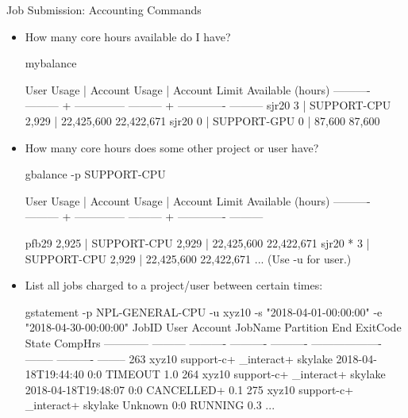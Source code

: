 \begin{frame}[fragile]{Job Submission: Accounting Commands}
\begin{itemize}
\item{How many core hours available do I have?}
\begin{semiverbatim}
\tiny
mybalance

User           Usage |        Account     Usage | Account Limit Available (hours)
---------- --------- + -------------- --------- + ------------- ---------
sjr20              3 |    SUPPORT-CPU     2,929 |    22,425,600 {\color{red}22,422,671}
sjr20              0 |    SUPPORT-GPU         0 |        87,600    {\color{red}87,600}
\end{semiverbatim}
\smallskip
\item{How many core hours does some other project or user have?}
\begin{semiverbatim}
\tiny
gbalance -p SUPPORT-CPU

User           Usage |        Account     Usage | Account Limit Available (hours)
---------- --------- + -------------- --------- + ------------- ---------

pfb29          2,925 |    SUPPORT-CPU     2,929 |    22,425,600 22,422,671
sjr20 *            3 |    SUPPORT-CPU     2,929 |    22,425,600 22,422,671
...
(Use -u for user.)
\end{semiverbatim}
\smallskip
\item{List all jobs charged to a project/user between certain times:}
\begin{semiverbatim}
\Tiny
gstatement -p NPL-GENERAL-CPU  -u xyz10 -s "2018-04-01-00:00:00" -e "2018-04-30-00:00:00" 
       JobID      User    Account    JobName  Partition                 End ExitCode      State  CompHrs 
------------ --------- ---------- ---------- ---------- ------------------- -------- ---------- -------- 
263              xyz10 support-c+ _interact+    skylake 2018-04-18T19:44:40      0:0    TIMEOUT      1.0
264              xyz10 support-c+ _interact+    skylake 2018-04-18T19:48:07      0:0 CANCELLED+      0.1
275              xyz10 support-c+ _interact+    skylake             Unknown      0:0    RUNNING      0.3
...
\end{semiverbatim}
\end{itemize}
\end{frame}



